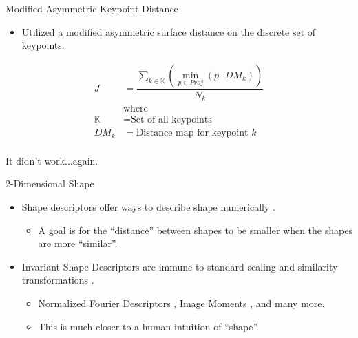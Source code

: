 \documentclass[presentation, aspectratio=1610]{beamer}
\begin{document}
\begin{frame}[label={sec:org9cbbef3}]{Modified Asymmetric Keypoint Distance}
\begin{itemize}
\item Utilized a modified asymmetric surface distance on the discrete set of keypoints.
\end{itemize}

\begin{equation}
  \label{eq:curv-keypoint}
  \begin{split}
    \displaystyle J &= \dfrac{\sum_{k \in \mathbb{K}}(\min_{p\in Proj}(p \cdot DM_{k}))}{N_k} \\
      &\text{where}\\
    \mathbb{K} &= \text{Set of all keypoints} \\
    DM_{k} &= \text{Distance map for keypoint $k$} \\
  \end{split}
\end{equation}

{\tiny It didn't work...again.}
\end{frame}
\begin{frame}[label={sec:org76ca9e6}]{2-Dimensional Shape}
\begin{itemize}
\item \alert{Shape descriptors} offer ways to describe shape numerically \autocites{zhangReviewShapeRepresentation2004}[][]{flusserInvariantShapeDescription1992}.
\begin{itemize}
\item A goal is for the ``distance'' between shapes to be smaller when the shapes are more ``similar''.
\end{itemize}
\item \alert{Invariant Shape Descriptors} are immune to standard scaling and similarity transformations \autocites{loweDistinctiveImageFeatures2004}[][]{khotanzadInvariantImageRecognition1990}.
\begin{itemize}
\item Normalized Fourier Descriptors \autocites{persoonShapeDiscriminationUsing1977}[][]{linClassificationPartial2D1987}[][]{wallaceEfficientThreedimensionalAircraft1980}[][]{wallaceAnalysisThreedimensionalMovement1980}[][]{banksAccurateMeasurementThreedimensional1996}, Image Moments \autocites{kimRegionbasedShapeDescriptor2000}[][]{khotanzadInvariantImageRecognition1990}, and many more.
\item This is much closer to a human-intuition of ``shape''.
\end{itemize}
\end{itemize}
\end{frame}
\end{document}
